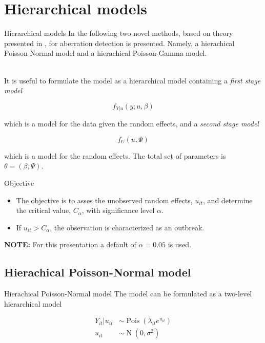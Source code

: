 \documentclass[aspectratio=169]{beamer}
\DeclareMathOperator{\N}{N}
\DeclareMathOperator{\Pois}{Pois}
\begin{document}
\hypertarget{hierarchical-models}{%
\section{Hierarchical models}\label{hierarchical-models}}

\begin{frame}{Hierarchical models}
In the following two novel methods, based on theory presented in
\cite{Madsen_2010}, for aberration detection is presented. Namely, a
hierachical Poisson-Normal model and a hierachical Poisson-Gamma
model.\\
\strut \\
It is useful to formulate the model as a hierarchical model containing a
\textit{first stage model}

\begin{equation}
  f_{Y|u}(y;u,\beta)
\end{equation}

which is a model for the data given the random effects, and a
\textit{second stage model}

\begin{equation}
  f_U(u, \Psi)
\end{equation}

which is a model for the random effects. The total set of parameters is
\(\theta=(\beta, \Psi)\).
\end{frame}

\begin{frame}{Objective}
\protect\hypertarget{objective}{}
\begin{itemize}
  \item The objective is to asses the unobserved random effects, $u_{it}$, and determine the critical value, $C_\alpha$, with significance level $\alpha$.
  \item If $u_{it}>C_\alpha$, the observation is characterized as an outbreak.
\end{itemize}

\hfill\break
\hfill\break
\textbf{NOTE:} For this presentation a default of \(\alpha=0.05\) is
used.
\end{frame}

\hypertarget{hierachical-poisson-normal-model}{%
\subsection{Hierachical Poisson-Normal
model}\label{hierachical-poisson-normal-model}}

\begin{frame}{Hierachical Poisson-Normal model}
The model can be formulated as a two-level hierarchical model

\begin{subequations}
  \begin{alignat}{2}
    Y_{it}|u_{it} &\sim \Pois (\lambda_{it}e^{u_{it}}) \label{eq:pois_ln0} \\ 
    u_{it} &\sim \N(0,\sigma^2) \label{eq:pois_ln1}
  \end{alignat}
\end{subequations}
\end{frame}
\end{document}
